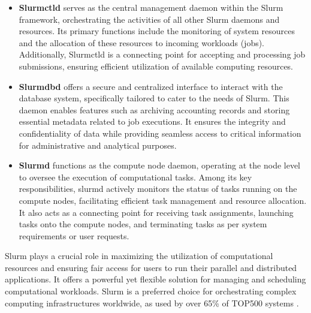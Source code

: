 \begin{itemize}
    \item \textbf{Slurmctld} serves as the central management daemon within the Slurm framework, orchestrating the activities of all other Slurm daemons and resources. Its primary functions include the monitoring of system resources and the allocation of these resources to incoming workloads (jobs). Additionally, Slurmctld is a connecting point for accepting and processing job submissions, ensuring efficient utilization of available computing resources.
    \item \textbf{Slurmdbd} offers a secure and centralized interface to interact with the database system, specifically tailored to cater to the needs of Slurm. This daemon enables features such as archiving accounting records and storing essential metadata related to job executions. It ensures the integrity and confidentiality of data while providing seamless access to critical information for administrative and analytical purposes.
    \item \textbf{Slurmd} functions as the compute node daemon, operating at the node level to oversee the execution of computational tasks. Among its key responsibilities, slurmd actively monitors the status of tasks running on the compute nodes, facilitating efficient task management and resource allocation. It also acts as a connecting point for receiving task assignments, launching tasks onto the compute nodes, and terminating tasks as per system requirements or user requests.
\end{itemize}

Slurm plays a crucial role in maximizing the utilization of computational resources and ensuring fair access for users to run their parallel and distributed applications. It offers a powerful yet flexible solution for managing and scheduling computational workloads. Slurm is a preferred choice for orchestrating complex computing infrastructures worldwide, as used by over 65\% of TOP500 systems \cite{aboutslurm}.


